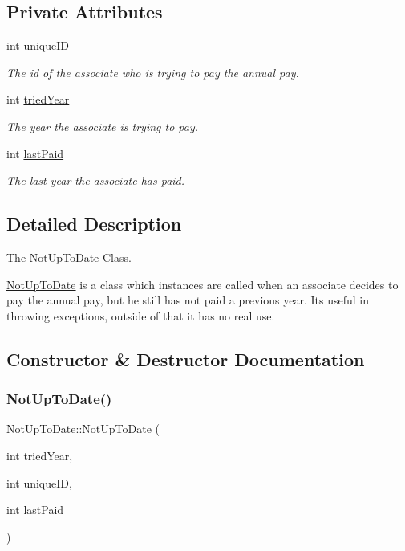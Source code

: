 \subsection*{Private Attributes}
\begin{DoxyCompactItemize}
\item 
int \mbox{\hyperlink{classNotUpToDate_afa612d29a846c1e7b679fbb069035a72}{unique\+ID}}
\begin{DoxyCompactList}\small\item\em The id of the associate who is trying to pay the annual pay. \end{DoxyCompactList}\item 
int \mbox{\hyperlink{classNotUpToDate_a5e44159542e23d8ad12aba8768bd3350}{tried\+Year}}
\begin{DoxyCompactList}\small\item\em The year the associate is trying to pay. \end{DoxyCompactList}\item 
int \mbox{\hyperlink{classNotUpToDate_a728feda5151336575cd80a9b52a7a7d3}{last\+Paid}}
\begin{DoxyCompactList}\small\item\em The last year the associate has paid. \end{DoxyCompactList}\end{DoxyCompactItemize}


\subsection{Detailed Description}
The \mbox{\hyperlink{classNotUpToDate}{Not\+Up\+To\+Date}} Class. 

\mbox{\hyperlink{classNotUpToDate}{Not\+Up\+To\+Date}} is a class which instances are called when an associate decides to pay the annual pay, but he still has not paid a previous year. Its useful in throwing exceptions, outside of that it has no real use. 

\subsection{Constructor \& Destructor Documentation}
\mbox{\label{classNotUpToDate_a61d903e6816ad8d5f5b496a72047df45}} 
\subsubsection{\texorpdfstring{Not\+Up\+To\+Date()}{NotUpToDate()}}
{\footnotesize\ttfamily Not\+Up\+To\+Date\+::\+Not\+Up\+To\+Date (\begin{DoxyParamCaption}\item[{int}]{tried\+Year,  }\item[{int}]{unique\+ID,  }\item[{int}]{last\+Paid }\end{DoxyParamCaption})\hspace{0.3cm}{\ttfamily [inline]}}



